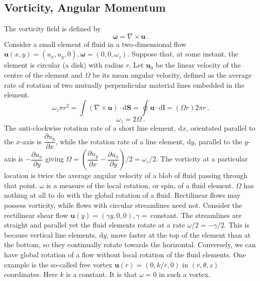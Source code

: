 \documentclass[12pt,a4paper]{article}
\renewcommand{\vec}[1]{\boldsymbol{#1}}
\newcommand{\dif}{\mathrm{d}}
\begin{document}
\subsection{Vorticity, Angular Momentum}
The vorticity field is defined by
\begin{equation}
\vec{\omega} = \nabla \times \vec{u} ~.
\end{equation}
Consider a small element of fluid in a two-dimensional flow $\vec{u}(x, y) = (u_x, u_y, 0), \vec{\omega} = (0, 0, \omega_z)$. Suppose that, at some instant, the element is circular (a disk) with radius $r$. Let $\vec{u}_0$ be the linear velocity of the centre of the element and $\Omega$ be its mean angular velocity, defined as the average rate of rotation of two mutually perpendicular material lines embedded in the element.
\begin{equation}
\omega_z \pi r^2 = \int (\nabla \times \vec{u}) \cdot \dif \vec{S} = \oint \vec{u}\cdot \dif \vec{l}  = (\Omega r)2\pi r~.
\end{equation}
\begin{equation}
\omega_z = 2\Omega ~.
\end{equation}
The anti-clockwise rotation rate of a short line element, $\dif x$, orientated parallel to the $x$-axis is $\dfrac{\partial u_y}{\partial x}$, while the rotation rate of a line element, $\dif y$, parallel to the $y$-axis is $-\dfrac{\partial u_x}{\partial y}$ giving $\Omega = \left(\dfrac{\partial u_y}{\partial x} - \dfrac{\partial u_x}{\partial y} \right)/2 = \omega_z/2$. The vorticity at a particular location is twice the average angular velocity of a blob of fluid passing through that point. $\omega$ is a measure of the local rotation, or spin, of a fluid element. $\Omega$ has nothing at all to do with the global rotation of a fluid. Rectilinear flows may possess vorticity, while flows with circular streamlines need not. Consider the rectilinear shear flow $\vec{u}(y) = (\gamma y, 0, 0), \gamma = ~$constant. The streamlines are straight and parallel yet the fluid elements rotate at a rate $\omega/2 = -\gamma/2$. This is because vertical line elements, $\dif y$, move faster at the top of the element than at the bottom, so they continually rotate towards the horizontal. Conversely, we can have global rotation of a flow without local rotation of the fluid elements. One example is the so-called free vortex $\vec{u}(r) = (0, k/r, 0)$ in $(r, \theta, z)$ coordinates. Here $k$ is a constant. It is that $\omega = 0$ in such a vortex.
\end{document}
